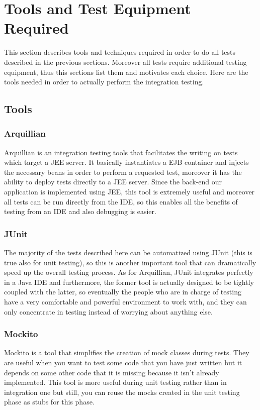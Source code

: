 \newpage
\section{Tools and Test Equipment Required}
This section describes tools and techniques required in order to do all tests described in the previous sections. Moreover all tests require additional testing equipment, thus this sections list them and motivates each choice.
Here are the tools needed in order to actually perform the integration testing.

\subsection{Tools}

\subsubsection{Arquillian}
Arquillian is an integration testing tools that facilitates the writing on tests which target a JEE server. It basically instantiates a EJB container and injects the necessary beans in order to perform a requested test, moreover it has the ability to deploy tests directly to a JEE server. Since the back-end our application is implemented using JEE, this tool is extremely useful and moreover all tests can be run directly from the IDE, so this enables all the benefits of testing from an IDE and also debugging is easier.

\subsubsection{JUnit}
The majority of the tests described here can be automatized using JUnit (this is true also for unit testing), so this is another important tool that can dramatically speed up the overall testing process. As for Arquillian, JUnit integrates perfectly in a Java IDE and furthermore, the former tool is actually designed to be tightly coupled with the latter, so eventually the people who are in charge of testing have a very comfortable and powerful environment to work with, and they can only concentrate in testing instead of worrying about anything else. 

\subsubsection{Mockito}
Mockito is a tool that simplifies the creation of mock classes during tests. They are useful when you want to test some code that you have just written but it depends on some other code that it is missing because it isn't already implemented. This tool is more useful during unit testing rather than in integration one but still, you can reuse the mocks created in the unit testing phase as stubs for this phase.

